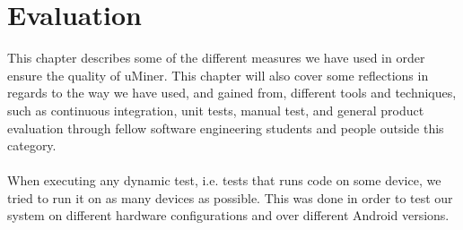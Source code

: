 
\chapter{Evaluation}
\label{cha:quality_assurance}

This chapter describes some of the different measures we have used in order ensure the quality of uMiner. This chapter will also cover some reflections in regards to the way we have used, and gained from, different tools and techniques, such as continuous integration, unit tests, manual test, and general product evaluation through fellow software engineering students and  people outside this category. 
\\\\
When executing any dynamic test, i.e. tests that runs code on some device, we tried to run it on as many devices as possible. This was done in order to test our system on different hardware configurations and over different Android versions.














